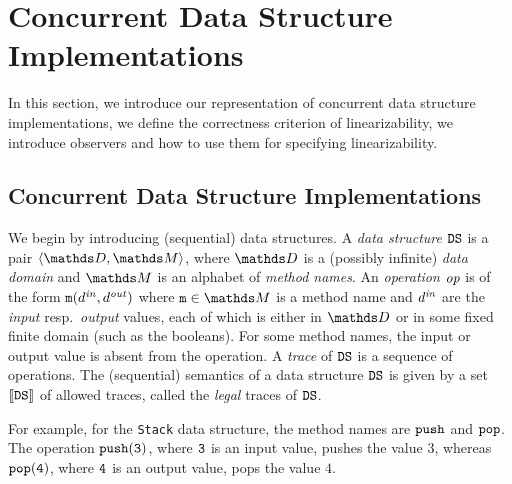 \section{Concurrent Data Structure Implementations}
\label{programs:section}
In this section, we introduce our representation of
concurrent data structure implementations, we define the correctness criterion of
linearizability, we introduce observers and how to use them for specifying
linearizability.

\subsection{Concurrent Data Structure Implementations}

We begin by introducing (sequential) data structures.
A {\it data structure} ${\tt DS}$ is a pair
$\tuple{\ddomain,\malphabet}$,
where $\ddomain$ is a (possibly infinite) {\it data domain} and 
$\malphabet$ is an alphabet of {\em method names}.
%
%
An {\it operation} 
${\it op}$ is of the form
${\tt m}(d^{\it in},d^{\it out})$ where 
$\mname\in\malphabet$ is a method name and 
$d^{\it in}$ are the {\it input} resp.\ {\it output} values, each of which
is either in $\ddomain$ or in some fixed finite domain (such as the booleans).
%
For some method names, the input or output value is absent from the operation.
A {\it trace} of ${\tt DS}$ is a sequence of operations.
The (sequential) semantics of a data structure ${\tt DS}$ is given by
a set $\left\llbracket{{\tt DS}}\right\rrbracket$ of allowed traces,
called the {\it legal} traces of ${\tt DS}$.


For example, for the {\tt Stack} data structure, the method names
are $\tt push$ and $\tt pop$.
%
The operation ${\tt push(3)}$, where $\tt 3$ is an input value, pushes
the value $3$, whereas ${\tt pop(4)}$, where $\tt 4$ is an output value,
pops the value $4$.

%

%


